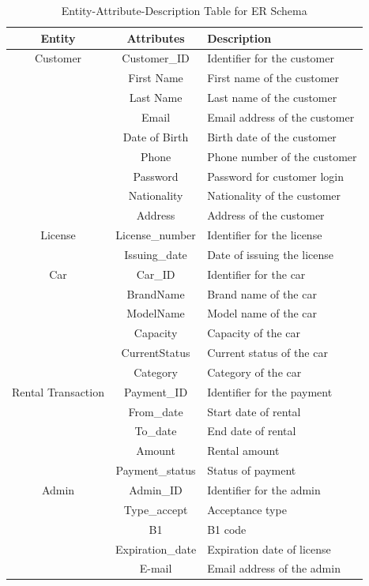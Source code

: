 \begin{table}[htbp]
    \centering
    \begin{tabular}{|c|c|p{4cm}|}
    \hline
    \textbf{Entity} & \textbf{Attributes} & \textbf{Description} \\
    \hline
    Customer & Customer\_ID & Identifier for the customer \\
             & First Name & First name of the customer \\
             & Last Name & Last name of the customer \\
             & Email & Email address of the customer \\
             & Date of Birth & Birth date of the customer \\
             & Phone & Phone number of the customer \\
             & Password & Password for customer login \\
             & Nationality & Nationality of the customer \\
             & Address & Address of the customer \\
    \hline
    License & License\_number & Identifier for the license \\
            & Issuing\_date & Date of issuing the license \\
    \hline
    Car & Car\_ID & Identifier for the car \\
        & BrandName & Brand name of the car \\
        & ModelName & Model name of the car \\
        & Capacity & Capacity of the car \\
        & CurrentStatus & Current status of the car \\
        & Category & Category of the car \\
    \hline
    Rental Transaction & Payment\_ID & Identifier for the payment \\
                       & From\_date & Start date of rental \\
                       & To\_date & End date of rental \\
                       & Amount & Rental amount \\
                       & Payment\_status & Status of payment \\
    \hline
    Admin & Admin\_ID & Identifier for the admin \\
          & Type\_accept & Acceptance type \\
          & B1 & B1 code \\
          & Expiration\_date & Expiration date of license \\
          & E-mail & Email address of the admin \\
    \hline
    \end{tabular}
    \caption{Entity-Attribute-Description Table for ER Schema}
    \label{tab:er-schema}
\end{table}




